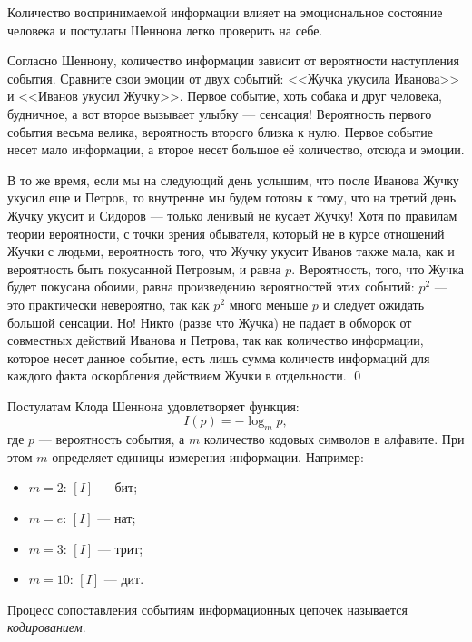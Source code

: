 \begin{exampl}
    Количество воспринимаемой информации влияет на эмоциональное состояние человека и постулаты Шеннона легко проверить на себе.
    
    Согласно Шеннону, количество информации зависит от вероятности наступления события. Сравните свои эмоции от двух событий: <<Жучка укусила Иванова>> и <<Иванов укусил Жучку>>. Первое событие, хоть собака и друг человека, будничное, а вот второе вызывает улыбку --- сенсация! Вероятность первого события весьма велика, вероятность второго близка к нулю. Первое событие несет мало информации, а второе несет большое её количество, отсюда и эмоции.

    В то же время, если мы на следующий день услышим, что после Иванова Жучку укусил еще и Петров, то внутренне мы будем готовы к тому, что на третий день Жучку укусит и Сидоров --- только ленивый не кусает Жучку! Хотя по правилам теории вероятности, с точки зрения обывателя, который не в курсе отношений Жучки с людьми, вероятность того, что Жучку укусит Иванов также мала, как и вероятность быть покусанной Петровым, и равна $p$. Вероятность, того, что Жучка будет покусана обоими, равна произведению вероятностей этих событий: $p^2$ --- это практически невероятно, так как $p^2$ много меньше $p$ и следует ожидать большой сенсации. Но! Никто (разве что Жучка) не падает в обморок от совместных действий Иванова и Петрова, так как количество информации, которое несет данное событие, есть лишь сумма количеств информаций для каждого факта оскорбления действием Жучки в отдельности.
    \qed
\end{exampl}

Постулатам Клода Шеннона удовлетворяет функция:
\begin{equation}
    \label{eq:code:shannon}
    I(p)=-\log_m p,
\end{equation}
где $p$ --- вероятность события, а $m$ количество кодовых символов в алфавите. При этом $m$ определяет единицы измерения информации. Например:
\begin{itemize}
    \item $m=2$: $[I]$ --- бит;
    \item $m=e$: $[I]$ --- нат;
    \item $m=3$: $[I]$ --- трит;
    \item $m=10$: $[I]$ --- дит.
\end{itemize}

Процесс сопоставления событиям информационных цепочек называется \emph{кодированием}.

